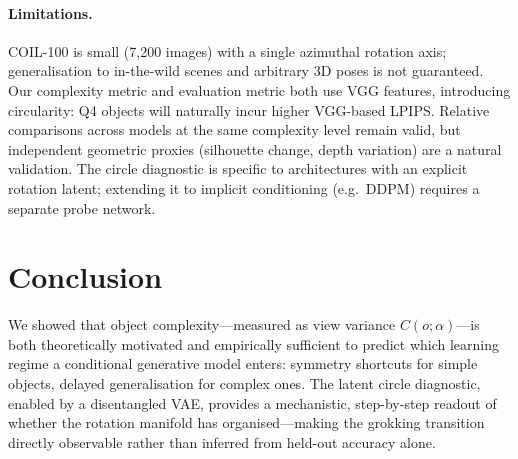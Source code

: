 \documentclass[11pt]{article}
\begin{document}
\paragraph{Limitations.}
COIL-100 is small (7,200 images) with a single azimuthal rotation axis;
generalisation to in-the-wild scenes and arbitrary 3D poses is not guaranteed.
Our complexity metric and evaluation metric both use VGG features, introducing
circularity: Q4 objects will naturally incur higher VGG-based LPIPS.  Relative
comparisons across models at the same complexity level remain valid, but
independent geometric proxies (silhouette change, depth variation) are a natural
validation.  The circle diagnostic is specific to architectures with an explicit
rotation latent; extending it to implicit conditioning (e.g.\ DDPM) requires a
separate probe network.

\section{Conclusion}
\label{sec:conclusion}

We showed that object complexity---measured as view variance $C(o;\alpha)$---is
both theoretically motivated and empirically sufficient to predict which learning
regime a conditional generative model enters: symmetry shortcuts for simple
objects, delayed generalisation for complex ones.  The latent circle diagnostic,
enabled by a disentangled VAE, provides a mechanistic, step-by-step readout of
whether the rotation manifold has organised---making the grokking transition
directly observable rather than inferred from held-out accuracy alone.
\end{document}
